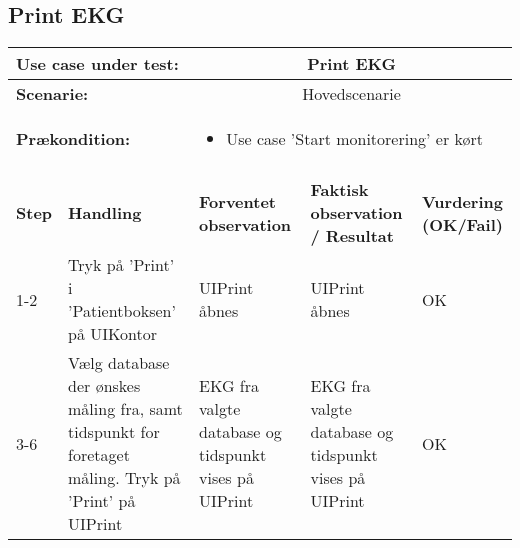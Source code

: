 \subsection{Print EKG}
\begin{tabular}{|p{1cm}|p{3cm}|p{4cm}|p{4cm}|p{2cm}|}
\hline
\multicolumn{2}{|p{4cm}|}{\textbf{Use case under test:}} & \multicolumn{3}{c|}{Print EKG} \\\hline

\multicolumn{2}{|p{3cm}|}{\textbf{Scenarie:}} & \multicolumn{3}{c|}{Hovedscenarie} \\\hline

\multicolumn{2}{|p{3cm}|}{\textbf{Prækondition:}}  & \multicolumn{3}{l|}{\parbox{0.6\textwidth}{
\begin{itemize}[label=$\circ$]
\item Use case 'Start monitorering' er kørt 
\end{itemize} }}\\\hline

\multicolumn{5}{|c|}{} \\\hline

\textbf{Step} & \textbf{Handling} & \textbf{Forventet observation} & \textbf{Faktisk observation / Resultat} & \textbf{Vurdering (OK/Fail)}\\\hline

1-2 & Tryk på 'Print' i 'Patientboksen' på UIKontor & UIPrint åbnes & UIPrint åbnes & OK \\\hline

3-6 & Vælg database der ønskes måling fra, samt tidspunkt for foretaget måling. Tryk på 'Print' på UIPrint & EKG fra valgte database og tidspunkt vises på UIPrint & EKG fra valgte database og tidspunkt vises på UIPrint & OK \\\hline

\end{tabular}
\\

